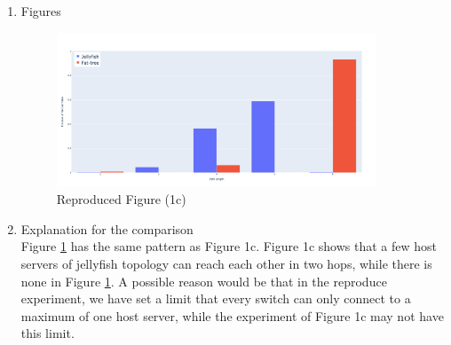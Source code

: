 \documentclass[a4paper,11pt]{article}
\newcommand{\note}[1]{\textit{\textcolor{gray}{#1}}}
\begin{document}
\begin{enumerate}
    \newpage
    \item Figures
    \begin{figure}[!htp]
    \centering
    \includegraphics[width=0.9\textwidth]{reproduce_1c.png}
    \caption{Reproduced Figure (1c)}
    \label{fig:rf1c}
    \end{figure}
    \item Explanation for the comparison \\

    Figure \ref{fig:rf1c} has the same pattern as Figure 1c. Figure 1c shows that a few host servers of jellyfish topology can reach each other in two hops, while there is none in Figure  \ref{fig:rf1c}. A possible reason would be that in the reproduce experiment, we have set a limit that every switch can only connect to a maximum of one host server, while the experiment of Figure 1c may not have this limit.
\end{enumerate}

\end{document}
